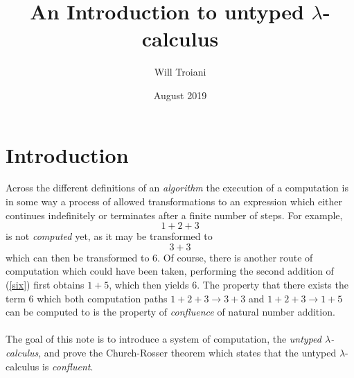 \documentclass[12pt]{article}
\title{An Introduction to untyped $\lambda$-calculus}
\author{Will Troiani}
\date{August 2019}
\theoremstyle{plane}
\theoremstyle{definition}
\begin{document}
	\maketitle
	
	\section{Introduction}
	Across the different definitions of an \emph{algorithm} the execution of a computation is in some way a process of allowed transformations to an expression which either continues indefinitely or terminates after a finite number of steps. For example,
	\begin{equation}
		\label{six}
		1 + 2 + 3
	\end{equation}
	is not \emph{computed} yet, as it may be transformed to
	\[3 + 3\]
	which can then be transformed to 6. Of course, there is another route of computation which could have been taken, performing the second addition of (\ref{six}) first obtains $1 + 5$, which then yields $6$. The property that there exists the term $6$ which both computation paths $1 + 2 + 3 \to 3 + 3$ and $1 + 2 + 3 \to 1 + 5$ can be computed to is the property of \emph{confluence} of natural number addition.\\\\
	The goal of this note is to introduce a system of computation, the \emph{untyped $\lambda$-calculus}, and prove the Church-Rosser theorem which states that the untyped $\lambda$-calculus is \emph{confluent}.
	
\end{document}
